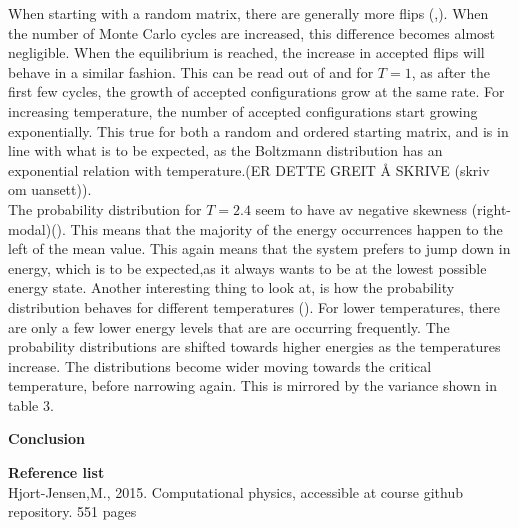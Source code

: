 \documentclass[10pt,a4paper]{article}
\begin{document}
\noindent When starting with a random matrix, there are generally more flips (,). When the number of Monte Carlo cycles are increased, this difference becomes almost negligible. When the equilibrium is reached, the increase in accepted flips will behave in a similar fashion. This can be read out of  and  for $T=1$, as after the first few cycles, the growth of accepted configurations grow at the same rate. For increasing temperature, the number of accepted configurations start growing exponentially. This true for both a random and ordered starting matrix, and is in line with what is to be expected, as the Boltzmann distribution has an exponential relation with temperature.(ER DETTE GREIT Å SKRIVE (skriv om uansett)).\\


\noindent The probability distribution for $T=2.4$ seem to have av negative skewness (right-modal)(). This means that the majority of the energy occurrences happen to the left of the mean value. This again means that the system prefers to jump down in energy, which is to be expected,as it always wants to be at the lowest possible energy state. Another interesting thing to look at, is how the probability distribution behaves for different temperatures (). For lower temperatures, there are only a few lower energy levels that are are occurring frequently. The probability distributions are shifted towards higher energies as the temperatures increase. The distributions become wider moving towards the critical temperature, before narrowing again. This is mirrored by the variance shown in table 3. 


  








\newpage
{\LARGE\bf
Conclusion
}
















\newpage
{\LARGE\bf
Reference list
}\\
Hjort-Jensen,M., 2015. Computational physics, accessible at course github repository. 551 pages
\end{document}
